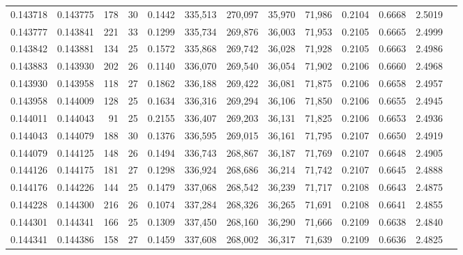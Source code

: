 \begin{tabular}{rrrrrrrrrrrrr}
0.143718 & 0.143775 & 178 &  30 &                                     0.1442 & 335,513 & 270,097 &  35,970 &  71,986 & 0.2104 & 0.6668 & 2.5019 \\
0.143777 & 0.143841 & 221 &  33 &                                     0.1299 & 335,734 & 269,876 &  36,003 &  71,953 & 0.2105 & 0.6665 & 2.4999 \\
0.143842 & 0.143881 & 134 &  25 &                                     0.1572 & 335,868 & 269,742 &  36,028 &  71,928 & 0.2105 & 0.6663 & 2.4986 \\
0.143883 & 0.143930 & 202 &  26 &                                     0.1140 & 336,070 & 269,540 &  36,054 &  71,902 & 0.2106 & 0.6660 & 2.4968 \\
0.143930 & 0.143958 & 118 &  27 &                                     0.1862 & 336,188 & 269,422 &  36,081 &  71,875 & 0.2106 & 0.6658 & 2.4957 \\
0.143958 & 0.144009 & 128 &  25 &                                     0.1634 & 336,316 & 269,294 &  36,106 &  71,850 & 0.2106 & 0.6655 & 2.4945 \\
0.144011 & 0.144043 &  91 &  25 &                                     0.2155 & 336,407 & 269,203 &  36,131 &  71,825 & 0.2106 & 0.6653 & 2.4936 \\
0.144043 & 0.144079 & 188 &  30 &                                     0.1376 & 336,595 & 269,015 &  36,161 &  71,795 & 0.2107 & 0.6650 & 2.4919 \\
0.144079 & 0.144125 & 148 &  26 &                                     0.1494 & 336,743 & 268,867 &  36,187 &  71,769 & 0.2107 & 0.6648 & 2.4905 \\
0.144126 & 0.144175 & 181 &  27 &                                     0.1298 & 336,924 & 268,686 &  36,214 &  71,742 & 0.2107 & 0.6645 & 2.4888 \\
0.144176 & 0.144226 & 144 &  25 &                                     0.1479 & 337,068 & 268,542 &  36,239 &  71,717 & 0.2108 & 0.6643 & 2.4875 \\
0.144228 & 0.144300 & 216 &  26 &                                     0.1074 & 337,284 & 268,326 &  36,265 &  71,691 & 0.2108 & 0.6641 & 2.4855 \\
0.144301 & 0.144341 & 166 &  25 &                                     0.1309 & 337,450 & 268,160 &  36,290 &  71,666 & 0.2109 & 0.6638 & 2.4840 \\
0.144341 & 0.144386 & 158 &  27 &                                     0.1459 & 337,608 & 268,002 &  36,317 &  71,639 & 0.2109 & 0.6636 & 2.4825 \\

\end{tabular}
